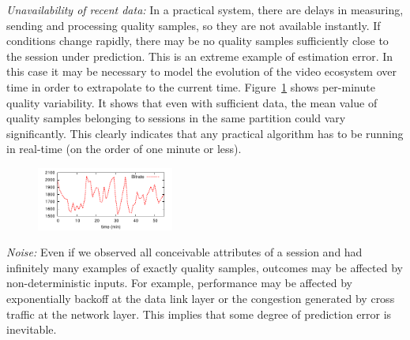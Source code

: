 \begin{packedenumerate}
\item \emph{Unavailability of recent data:} In a practical system,
  there are delays in measuring, sending and processing quality
  samples, so they are not available instantly.  If conditions change
  rapidly, there may be no quality samples sufficiently close to the
  session under prediction.  This is an extreme example of estimation
  error.  In this case it may be necessary to model the evolution of
  the video ecosystem over time in order to extrapolate to the current
  time. Figure~\ref{fig:quality-variability} shows per-minute quality
  variability. It shows that even with sufficient data, the mean value
  of quality samples belonging to sessions in the same partition could
  vary significantly. This clearly indicates that any practical
  algorithm has to be running in real-time (on the order of one minute
  or less).

\begin{figure}[h!]
\centering
 \includegraphics[width=0.4\textwidth] {figures/quality-time.pdf}
\label{fig:quality-variability}
\end{figure}

\item \emph{Noise:} Even if we observed all conceivable attributes of
  a session and had infinitely many examples of exactly quality
  samples, outcomes may be affected by non-deterministic inputs.  For
  example, performance may be affected by exponentially backoff at the
  data link layer or the congestion generated by cross traffic at the
  network layer. This implies that some degree of prediction error is
  inevitable.  
\end{packedenumerate}


